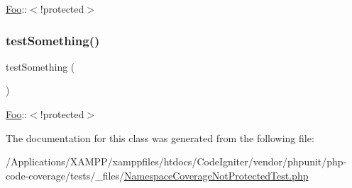 \mbox{\hyperlink{class_foo}{Foo}}\+:\+:$<$!protected$>$ \mbox{\label{class_namespace_coverage_not_protected_test_a0fc4e17369bc9607ebdd850d9eda8167}} 
\subsubsection{\texorpdfstring{test\+Something()}{testSomething()}\hspace{0.1cm}{\footnotesize\ttfamily [2/2]}}
{\footnotesize\ttfamily test\+Something (\begin{DoxyParamCaption}{ }\end{DoxyParamCaption})}

\mbox{\hyperlink{class_foo}{Foo}}\+:\+:$<$!protected$>$ 

The documentation for this class was generated from the following file\+:\begin{DoxyCompactItemize}
\item 
/\+Applications/\+X\+A\+M\+P\+P/xamppfiles/htdocs/\+Code\+Igniter/vendor/phpunit/php-\/code-\/coverage/tests/\+\_\+files/\mbox{\hyperlink{php-code-coverage_2tests_2__files_2_namespace_coverage_not_protected_test_8php}{Namespace\+Coverage\+Not\+Protected\+Test.\+php}}\end{DoxyCompactItemize}
